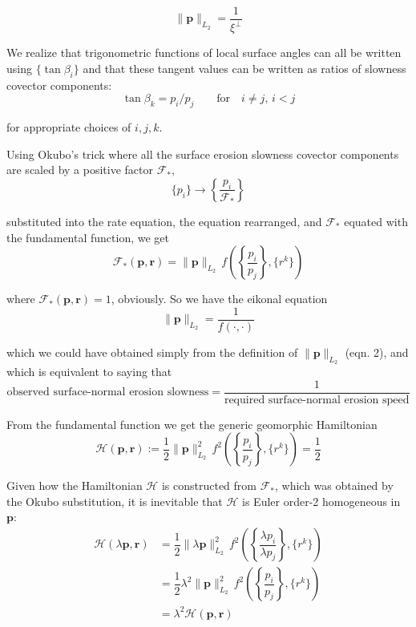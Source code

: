 \documentclass[11pt]{article}
\begin{document}
\begin{equation}
    \|\mathbf{p}\|_{L_2} = \dfrac{1}{\xi^{\perp}}
\end{equation}

We realize that trigonometric functions of local surface angles can all
be written using \(\{\tan\beta_i\}\) and that these tangent values can
be written as ratios of slowness covector components: \begin{equation}
    \tan\beta_k = p_i / p_j
    \qquad\text{for}\quad
    i \neq j, \, i<j
\end{equation}

for appropriate choices of \(i,j,k\).

Using Okubo's trick where all the surface erosion slowness covector
components are scaled by a positive factor \(\mathcal{F}_*\),
\begin{equation}
    \{p_i\} \rightarrow \left\{ \dfrac{p_i}{\mathcal{F}_*} \right\}
\end{equation}

substituted into the rate equation, the equation rearranged, and
\(\mathcal{F}_*\) equated with the fundamental function, we get
\begin{equation}
    {\mathcal{F}_*(\mathbf{p},\mathbf{r})} 
    = {\|\mathbf{p}\|_{L_2}}\,f\!\left(\left\{\dfrac{p_i}{p_j}\right\}, \{r^k\}\right)
\end{equation}

where \(\mathcal{F}_*(\mathbf{p},\mathbf{r})=1\), obviously. So we have
the eikonal equation \begin{equation}
    \|\mathbf{p}\|_{L_2} = \dfrac{1}{f\!\left(\cdot,\cdot\right)}
\end{equation}

which we could have obtained simply from the definition of
\(\|\mathbf{p}\|_{L_2}\) (eqn. 2), and which is equivalent to saying
that \begin{equation}
    \text{observed surface-normal erosion slowness} = \dfrac{1}{\text{required surface-normal erosion speed}}
\end{equation}

From the fundamental function we get the generic geomorphic Hamiltonian
\begin{equation}
    \mathcal{H}(\mathbf{p},\mathbf{r}) 
    := \dfrac{1}{2}\|\mathbf{p}\|_{L_2}^2 \, f^2\!\left(\left\{\dfrac{p_i}{p_j}\right\}, \{r^k\}\right)
    = \dfrac{1}{2}
\end{equation}

Given how the Hamiltonian \(\mathcal{H}\) is constructed from
\(\mathcal{F}_*\), which was obtained by the Okubo substitution, it is
inevitable that \(\mathcal{H}\) is Euler order-2 homogeneous in
\(\mathbf{p}\): \begin{align}
    \mathcal{H}(\lambda\mathbf{p},\mathbf{r}) 
    &= \dfrac{1}{2}\|\lambda\mathbf{p}\|_{L_2}^2 \, f^2\!\left(\left\{\dfrac{\lambda p_i}{\lambda p_j}\right\}, \{r^k\}\right) \\
    &= \dfrac{1}{2}\lambda^2 \|\mathbf{p}\|_{L_2}^2 \, f^2\!\left(\left\{\dfrac{p_i}{p_j}\right\}, \{r^k\}\right) \\
    &= \lambda^2 \mathcal{H}(\mathbf{p},\mathbf{r}) 
\end{align}
\end{document}
